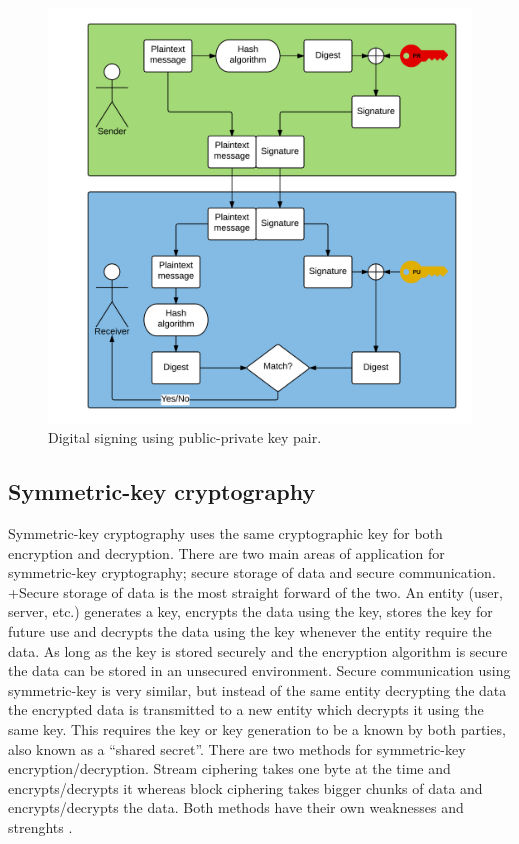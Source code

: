\begin{figure}[h!]
  \captionsetup{justification=centering,margin=1.5cm}
  \caption{Digital signing using public-private key pair.}
  \label{fig:signing_basic}
  \centering
    \includegraphics[width=1\textwidth]{images/signing_basic.png}
\end{figure}

\subsection{Symmetric-key cryptography}
Symmetric-key cryptography uses the same cryptographic key for both encryption and decryption. There are two main areas of application for symmetric-key cryptography; secure storage of data and secure communication. +Secure storage of data is the most straight forward of the two. An entity (user, server, etc.) generates a key, encrypts the data using the key, stores the key for future use and decrypts the data using the key whenever the entity require the data. As long as the key is stored securely and the encryption algorithm is secure the data can be stored in an unsecured environment. Secure communication using symmetric-key is very similar, but instead of the same entity decrypting the data the encrypted data is transmitted to a new entity which decrypts it using the same key. This requires the key or key generation to be a known by both parties, also known as a ``shared secret''. There are two methods for symmetric-key encryption/decryption. Stream ciphering takes one byte at the time and encrypts/decrypts it whereas block ciphering takes bigger chunks of data and encrypts/decrypts the data. Both methods have their own weaknesses and strenghts \cite[~Ch. 2.1.1]{cryptoMath}.

